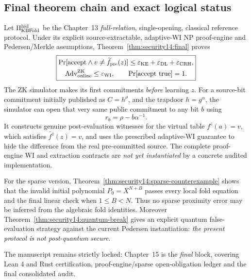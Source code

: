 \subsection{Final theorem chain and exact logical status}\label{sec:security14:conclusion}
Let $\Pi_{\rm KBFold}^{\rm hid}$
be the Chapter~13
\emph{full-relation},
single-opening, classical
reference protocol.
Under its explicit
source-extractable,
adaptive-WI NP proof-engine
and Pedersen/Merkle
assumptions,
Theorem~\ref{thm:security14:final}
proves
\[
 \boxed{
 \begin{gathered}
 \Pr[\mathrm{accept}\land
 v\ne\widetilde f_{\rm pre}(z)]
 \le
 \varepsilon_{\rm KE}
 +\varepsilon_{\rm DL}
 +\varepsilon_{\rm CRH},\\
 \operatorname{Adv}^{\rm ZK}_{\rm online}
 \le\varepsilon_{\rm WI},\qquad
 \Pr[\mathrm{accept\ true}]=1.
 \end{gathered}}
\]
The ZK simulator makes its
first commitments
\emph{before} learning $z$.
For a source-bit
commitment initially
published as
$C=h^\rho$, and
the trapdoor
$h=g^\alpha$, the
simulator can open
that very same public
commitment to any bit
$b$ using
\[
 \boxed{r_b=\rho-b\alpha^{-1}.}
\]
It constructs genuine
post-evaluation
witnesses for the
virtual table
$f^z(a)=v$, which
satisfies
$\widetilde{f^z}(z)=v$,
and uses the prescribed
adaptive-WI guarantee
to hide the difference
from the real
pre-committed source.
The complete
proof-engine WI
and extraction
contracts are
\emph{not yet
instantiated} by
a concrete audited
implementation.

For the sparse version,
Theorem~\ref{thm:security14:sparse-counterexample}
shows that the
invalid initial
polynomial
$P_0=X^{N+B}$
passes every local
fold equation and
the final linear
check when $1\le B<N$.
Thus no sparse
proximity error may
be inferred from
the algebraic
fold identities.
Moreover
Theorem~\ref{thm:security14:quantum-break}
gives an explicit
quantum false-evaluation
strategy against the
current Pedersen
instantiation:
\emph{the present
protocol is not
post-quantum secure}.

The manuscript remains
strictly locked:
Chapter~15 is the
\emph{final} block,
covering Lean 4 and
Rust certification,
proof-engine/sparse
open-obligation ledger
and the final
consolidated audit.
